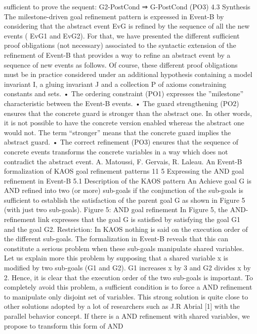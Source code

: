 sufficient to prove the sequent:
G2-PostCond ⇒ G-PostCond (PO3)
4.3 Synthesis
The milestone-driven goal refinement pattern is expressed in Event-B by considering that the
abstract event EvG is refined by the sequence of all the new events ( EvG1 and EvG2).
For that, we have presented the different sufficient proof obligations (not necessary) associated to the syntactic extension of the refinement of Event-B that provides a way to refine
an abstract event by a sequence of new events as follows. Of course, these different proof
obligations must be in practice considered under an additional hypothesis containing a model
invariant I, a gluing invariant J and a collection P of axioms constraining constants and sets.
• The ordering constraint (PO1) expresses the ”milestone” characteristic between the
Event-B events.
• The guard strengthening (PO2) ensures that the concrete guard is stronger than the
abstract one. In other words, it is not possible to have the concrete version enabled
whereas the abstract one would not. The term “stronger” means that the concrete
guard implies the abstract guard.
• The correct refinement (PO3) ensures that the sequence of concrete events transforms
the concrete variables in a way which does not contradict the abstract event.
A. Matoussi, F. Gervais, R. Laleau. An Event-B formalization of KAOS goal refinement patterns 11
5 Expressing the AND goal refinement in Event-B
5.1 Description of the KAOS pattern
An Achieve goal G is AND refined into two (or more) sub-goals if the conjunction of the
sub-goals is sufficient to establish the satisfaction of the parent goal G as shown in Figure 5
(with just two sub-goals).
Figure 5: AND goal refinement
In Figure 5, the AND-refinement link expresses that the goal G is satisfied by satisfying
the goal G1 and the goal G2.
Restriction: In KAOS nothing is said on the execution order of the different sub-goals.
The formalization in Event-B reveals that this can constitute a serious problem when these
sub-goals manipulate shared variables. Let us explain more this problem by supposing that
a shared variable x is modified by two sub-goals (G1 and G2). G1 increases x by 3 and G2
divides x by 2. Hence, it is clear that the execution order of the two sub-goals is important.
To completely avoid this problem, a sufficient condition is to force a AND refinement to
manipulate only disjoint set of variables. This strong solution is quite close to other solutions
adopted by a lot of researchers such as J.R Abrial [1] with the parallel behavior concept. If
there is a AND refinement with shared variables, we propose to transform this form of AND
